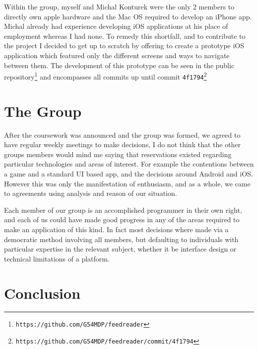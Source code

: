\documentclass[a4paper,11pt]{article}
\begin{document}
	Within the group, myself and Michal Konturek were the only 2 members to directly own apple hardware and the Mac OS required to develop an iPhone app. Michal already had experience developing iOS applications at his place of employment whereas I had none. To remedy this shortfall, and to contribute to the project I decided to get up to scratch by offering to create a prototype iOS application which featured only the different screens and ways to navigate between them. The development of this prototype can be seen in the public repository\footnote{\texttt{https://github.com/G54MDP/feedreader}} and encompasses all commits up until commit \verb!4f1794!\footnote{\texttt{https://github.com/G54MDP/feedreader/commit/4f1794}}
	
	\section{The Group}
    
    After the coursework was announced and the group was formed, we agreed to have regular weekly meetings to make decisions, I do not think that the other groups members would mind me saying that reservations existed regarding particular technologies and areas of interest. For example the contentions between a game and a standard UI based app, and the decisions around Android and iOS. However this was only the manifestation of enthusiasm, and as a whole, we came to agreements using analysis and reason of our situation.
	
	Each member of our group is an accomplished programmer in their own right, and each of us could have made good progress in any of the areas required to make an application of this kind. In fact most decisions where made via a democratic method involving all members, but defaulting to individuals with particular expertise in the relevant subject, whether it be interface design or technical limitations of a platform.
	
	\section{Conclusion}
\end{document}
